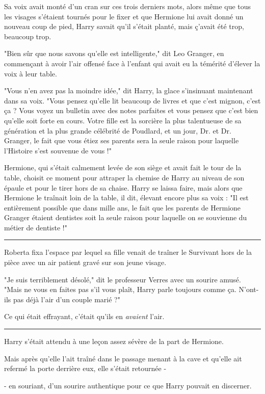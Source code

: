 Sa voix avait monté d'un cran sur ces trois derniers mots, alors même que tous les visages s'étaient tournés pour le fixer et que Hermione lui avait donné un nouveau coup de pied, Harry savait qu'il s'était planté, mais ç'avait été trop, beaucoup trop.

"Bien sûr que nous savons qu'elle est intelligente," dit Leo Granger, en commençant à avoir l'air offensé face à l'enfant qui avait eu la témérité d'élever la voix à leur table.

"Vous n'en avez pas la moindre idée," dit Harry, la glace s'insinuant maintenant dans sa voix. "Vous pensez qu'elle lit beaucoup de livres et que c'est mignon, c'est ça ? Vous voyez un bulletin avec des notes parfaites et vous pensez que c'est bien qu'elle soit forte en cours. Votre fille est la sorcière la plus talentueuse de sa génération et la plus grande célébrité de Poudlard, et un jour, Dr. et Dr. Granger, le fait que vous étiez ses parents sera la seule raison pour laquelle l'Histoire s'est souvenue de vous !"

Hermione, qui s'était calmement levée de son siège et avait fait le tour de la table, choisit ce moment pour attraper la chemise de Harry au niveau de son épaule et pour le tirer hors de sa chaise. Harry se laissa faire, mais alors que Hermione le traînait loin de la table, il dit, élevant encore plus sa voix : "Il est entièrement possible que dans mille ans, le fait que les parents de Hermione Granger étaient dentistes soit la seule raison pour laquelle on se souvienne du métier de dentiste !"
\par\noindent\rule{\textwidth}{0.4pt}
Roberta fixa l'espace par lequel sa fille venait de traîner le Survivant hors de la pièce avec un air patient gravé sur son jeune visage.

"Je suis terriblement désolé," dit le professeur Verres avec un sourire amusé. "Mais ne vous en faites pas s'il vous plaît, Harry parle toujours comme ça. N'ont-ils pas déjà l'air d'un couple marié ?"

Ce qui était effrayant, c'était qu'ils en \emph{avaient } l'air.
\par\noindent\rule{\textwidth}{0.4pt}
Harry s'était attendu à une leçon assez sévère de la part de Hermione.

Mais après qu'elle l'ait traîné dans le passage menant à la cave et qu'elle ait refermé la porte derrière eux, elle s'était retournée -

- en souriant, d'un sourire authentique pour ce que Harry pouvait en discerner.

